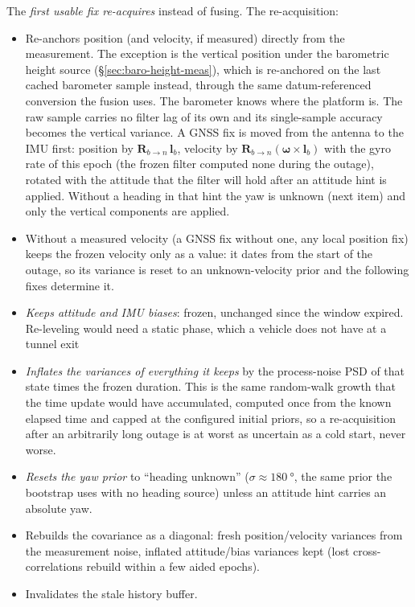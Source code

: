 \documentclass[11pt,a4paper]{article}
\begin{document}
The \emph{first usable fix re-acquires} instead of fusing. The re-acquisition:
\begin{itemize}
  \item Re-anchors position (and velocity, if measured) directly from
        the measurement. The exception is the vertical position under the
        barometric height source (\S\ref{sec:baro-height-meas}), which
        is re-anchored on the last cached barometer sample instead,
        through the same datum-referenced conversion the fusion uses.
        The barometer knows where the platform is. The raw sample
        carries no filter lag of its own and its single-sample accuracy
        becomes the vertical variance. A GNSS fix is moved from the antenna
        to the IMU first: position by $\mathbf{R}_{b\to n}\,\mathbf{l}_b$,
        velocity by $\mathbf{R}_{b\to n}(\boldsymbol{\omega}\times\mathbf{l}_b)$
        with the gyro rate of this epoch (the frozen filter computed none during
        the outage), rotated with the attitude that the filter will hold after an
        attitude hint is applied. Without a heading in that hint the yaw is
        unknown (next item) and only the vertical components are applied.
  \item Without a measured velocity (a GNSS fix without one, any local
        position fix) keeps the frozen velocity only as a value: it dates
        from the start of the outage, so its variance is reset to an
        unknown-velocity prior and the following fixes determine it.
  \item \emph{Keeps attitude and IMU biases}: frozen, unchanged since
        the window expired. Re-leveling would need a static phase, which a
        vehicle does not have at a tunnel exit
  \item \emph{Inflates the variances of everything it keeps} by the
        process-noise PSD of that state times the frozen duration. This is the
        same random-walk growth that the time update would have accumulated,
        computed once from the known elapsed time and capped at the
        configured initial priors, so a re-acquisition after an
        arbitrarily long outage is at worst as uncertain as a cold
        start, never worse.
  \item \emph{Resets the yaw \emph{prior}} to ``heading unknown''
        ($\sigma \approx \SI{180}{\degree}$, the same prior the bootstrap
        uses with no heading source) unless an attitude hint carries an
        absolute yaw.
  \item Rebuilds the covariance as a diagonal: fresh position/velocity
        variances from the measurement noise, inflated attitude/bias
        variances kept (lost cross-correlations rebuild within a few
        aided epochs).
  \item Invalidates the stale history buffer.
\end{itemize}
\end{document}
